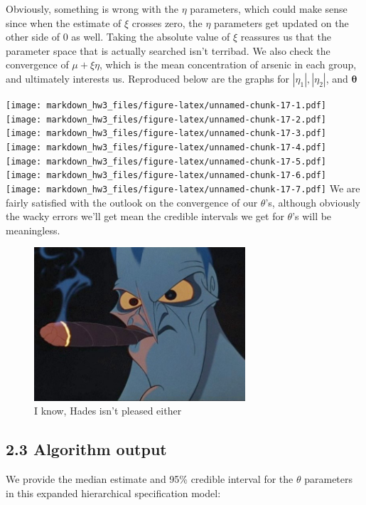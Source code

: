 \documentclass[]{article}
\begin{document}
Obviously, something is wrong with the \(\eta\) parameters, which could
make sense since when the estimate of \(\xi\) crosses zero, the \(\eta\)
parameters get updated on the other side of \(0\) as well. Taking the
absolute value of \(\xi\) reassures us that the parameter space that is
actually searched isn't terribad. We also check the convergence of
\(\mu + \xi\eta\), which is the mean concentration of arsenic in each
group, and ultimately interests us. Reproduced below are the graphs for
\(|\eta_1|, |\eta_2|\), and \(\boldsymbol{\theta}\)

\texttt{[image: markdown\_hw3\_files/figure-latex/unnamed-chunk-17-1.pdf]}
\texttt{[image: markdown\_hw3\_files/figure-latex/unnamed-chunk-17-2.pdf]}
\texttt{[image: markdown\_hw3\_files/figure-latex/unnamed-chunk-17-3.pdf]}
\texttt{[image: markdown\_hw3\_files/figure-latex/unnamed-chunk-17-4.pdf]}
\texttt{[image: markdown\_hw3\_files/figure-latex/unnamed-chunk-17-5.pdf]}
\texttt{[image: markdown\_hw3\_files/figure-latex/unnamed-chunk-17-6.pdf]}
\texttt{[image: markdown\_hw3\_files/figure-latex/unnamed-chunk-17-7.pdf]}
We are fairly satisfied with the outlook on the convergence of our
\(\theta\)'s, although obviously the wacky errors we'll get mean the
credible intervals we get for \(\theta\)'s will be meaningless.

\begin{figure}[h]
  \centering \includegraphics[width=0.7\textwidth]{hadeswrong}
  \caption{I know, Hades isn't pleased either}
\end{figure}\subsection{2.3 Algorithm output}

We provide the median estimate and 95\% credible interval for the
\(\theta\) parameters in this expanded hierarchical specification model:
\end{document}

